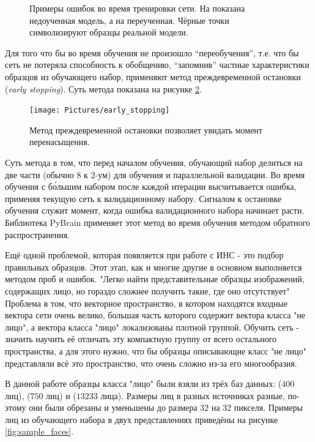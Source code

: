 \documentclass[12pt]{report}
\begin{document}
\begin{figure}[h]
	\centering
	\caption{Примеры ошибок во время тренировки сети. На  показана недоученная модель, а на 
 переученная. Чёрные точки символизируют образцы реальной модели. \citep{bradski2008learning}}
	\label{fig:under_over_fit}
\end{figure}

Для того что бы во время обучения не произошло ``переобучения'', т.е. что бы сеть не потеряла способность к 
обобщению, ``запомнив'' частные характеристики образцов из обучающего набор, применяют метод преждевременной 
остановки (\textit{early stopping}). Суть метода показана на рисунке \ref{fig:early_stop}.

\begin{figure}[h]
	\centering
	\texttt{[image: Pictures/early\_stopping]}
	\caption{Метод преждевременной остановки позволяет увидать момент перенасыщения.}
	\label{fig:early_stop}
\end{figure}

Суть метода в том, что перед началом обучения, обучающий набор делиться на две части (обычно 8 к 2-ум) для обучения 
и 
параллельной валидации. Во время обучения с б\'{о}льшим набором после каждой итерации высчитывается ошибка, 
применяя 
текущую сеть к валидационному набору. Сигналом к остановке обучения служит момент, когда ошибка валидационного 
набора 
начинает расти. Библиотека PyBrain применяет этот метод во время обучения методом обратного распространения.

Ещё одной проблемой, которая появляется при работе с ИНС - это подбор правильных образцов. Этот этап, как и многие 
другие в основном выполняется методом проб и ошибок. "Легко найти представительные образцы изображений, содержащих 
лицо, но гораздо сложнее получить такие, где оно отсутствует" \citep{rowley1998neural} Проблема в том, что 
векторное 
пространство, в котором находятся входные вектора сети очень велико, большая часть которого содержит вектора класса 
"не лицо", а вектора класса "лицо" локализованы плотной группой. Обучить сеть - значить научить её отличать эту 
компактную группу от всего остального пространства, а для этого нужно, что бы образцы описывающие класс "не лицо" 
представляли всё это пространство, что очень сложно из-за его многообразия. %

В данной работе образцы класса "лицо" были взяли из трёх баз данных: \citep{samaria1994parameterisation} ($400$ 
лиц), 
\citep{GeorgiaTechFaceDatabase} ($750$ лиц) и \citep{huang2007labeled} ($13 233$ лица). Размеры лиц в разных 
источниках разные, по-этому они были  обрезаны и уменьшены до размера 32 на 32 пикселя. Примеры лиц из обучающего 
набора в двух представлениях приведёны на рисунке \ref{fig:sample_faces}.
\end{document}
